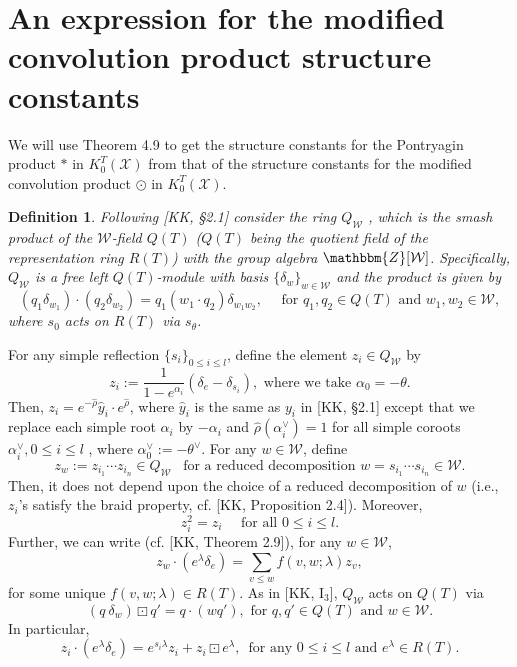 \documentclass{article}
\newtheorem{definition}[theorem]{Definition}
\def\X{\mathcal{X}}
\def\W{\mathcal{W}}
\def\ref#1{#1}
\begin{document}
\section{An expression for the modified convolution product structure constants}

We will use Theorem \ref{4.9} to get the structure constants for the Pontryagin product $*$ in $K^T_0(\X)$ from that of the structure constants for the modified convolution product $\odot$ in $K_0^T(\X)$. 

\begin{definition} \label{def5.1} \rm{
Following [KK, \S2.1] consider the ring $Q_\W$ , which is the smash product of the $\W$-field $Q(T)$ ($Q(T)$ being the quotient field of the representation ring $R(T)$) with the group algebra $\mathbbm{Z}[\W]$. Specifically, $Q_\W$ is a free left $Q(T)$-module with basis $\{\delta_w\}_{w\in \W}$ and the product is given by 
$$
\left(q_1\delta_{w_1}\right) \cdot \left( q_2\delta_{w_2}\right) = q_1 \left(w_1\cdot q_2\right) \delta_{w_1w_2}, \quad \mbox{ for } q_1,q_2 \in Q(T) \,\,\text{and  $w_1, w_2 \in \W$},
$$
where $s_0$ acts on $R(T)$ via $s_\theta$. }
\end{definition}

For any simple reflection $\{s_i\}_{0\leq i\leq l}$, define the element $z_i \in Q_\W$ by 
$$
z_i := \frac{1}{1-e^{\alpha_i}} \left( \delta_e-\delta_{s_i}\right),\mbox{ where we take } \alpha_0 = -\theta.
$$
Then, $z_i= e^{-\hat{\rho}}\hat{y}_i\cdot e^{\hat{\rho}}$, where $\hat{y}_i$ is the same as ${y}_i$ in [KK, \S2.1] except that we replace each simple root $\alpha_i$ by $-\alpha_i$ and  $\hat{\rho}(\alpha_i^\vee)=1$ for all simple coroots $\alpha_i^\vee,0\leq i\leq l$ , where 
$\alpha^\vee_0 :=-\theta^\vee$. For any $w\in \W$, define
 $$z_w:=z_{i_1}\cdots z_{i_n}\in Q_\W\,\,\,\text{ for a reduced decomposition $w=s_{i_1}\cdots s_{i_n}\in \W$}.$$
 Then, it does not depend upon the choice of a reduced decomposition of $w$ (i.e.,  $z_{i}$'s satisfy the braid property, cf. [KK, Proposition 2.4]). Moreover,
$$
z_i^2 =z_i \quad \mbox{ for all } 0\leq i \leq l.
$$
Further, we can write (cf. [KK, Theorem 2.9]), for any $w\in \W$,
$$z_w\cdot \left(e^\lambda \delta_e\right) = \sum_{v\leq w} f\left( v,w; \lambda\right) z_v,$$
 for some unique 
$f\left( v,w; \lambda\right) \in R(T)$.
As in [KK, I$_3$], $Q_\W$ acts on $Q(T)$ via
$$
\left(q~\delta_w\right)\boxdot q' = q\cdot \left(wq'\right), \mbox{ for } q,q'\in Q (T) \mbox{ and }w\in \W.
$$
In particular,
\begin{equation} \label{5.1.1} 
z_i\cdot (e^\lambda\delta_e) = e^{s_i\lambda} z_i+ z_i \boxdot e^\lambda, \,\,\,\text{for any $0\leq i\leq l$ and $e^\lambda \in R(T).$}
\end{equation}
\end{document}
